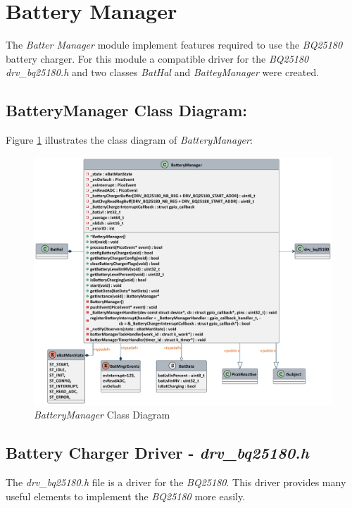 \documentclass[report.tex]{subfiles}
\begin{document}
\pagebreak

\section{Battery Manager}
The \textit{Batter Manager} module implement features required to use the \textit{BQ25180} battery  charger. For this module a compatible driver for the \textit{BQ25180} \textit{drv\_bq25180.h} and two classes \textit{BatHal} and \textit{BatteyManager} were created.

\subsection{BatteryManager Class Diagram:}

Figure \ref{fig:batterymanager} illustrates the class diagram of \textit{BatteryManager}: 

\begin{figure}[H]
	\centering
	\includegraphics[width=1\textwidth]{Include/Figure/software/class/batterymanager.pdf}
	\caption{\textit{BatteryManager} Class Diagram}
	\label{fig:batterymanager}
\end{figure}

\subsection{Battery Charger Driver - \textit{drv\_bq25180.h}}
The \textit{drv\_bq25180.h} file is a driver for the \textit{BQ25180}. This driver provides many useful elements to implement the \textit{BQ25180} more easily.
\end{document}
